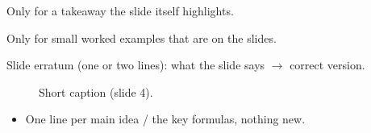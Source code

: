 \begin{keyidea}
  Only for a takeaway the slide itself highlights.
\end{keyidea}

\begin{example}
  Only for small worked examples that are on the slides.
\end{example}

\begin{caution}
  Slide erratum (one or two lines): what the slide says $\to$ correct version.
\end{caution}

\begin{figure}[htbp]
  \centering
  \caption{Short caption (slide 4).}\label{fig:lecNN-example}
\end{figure}

\bigskip{}
{}
\begin{summarybox}
  \begin{itemize}
    \item One line per main idea / the key formulas, nothing new.
  \end{itemize}
\end{summarybox}
